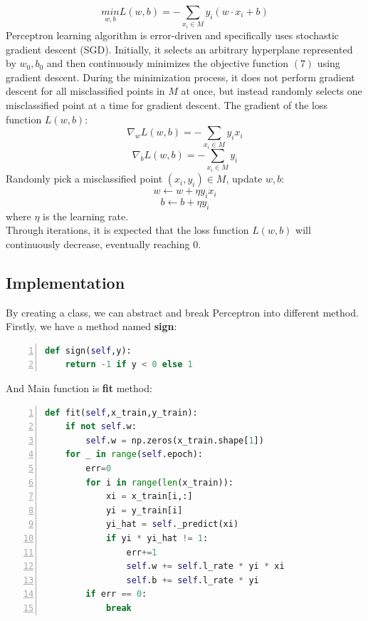 \documentclass[10pt,twocolumn,letterpaper]{article}
\begin{document}
\begin{equation}
	\underset{w,b}{min}L(w,b)=-\sum_{x_i \in M}{}y_i(w \cdot x_i + b)
\end{equation}
\indent Perceptron learning algorithm is error-driven and specifically uses stochastic gradient descent\cite{bottou2012stochastic} (SGD).
Initially, it selects an arbitrary hyperplane represented by $w_0,b_0$ and then continuously minimizes the objective function $(7)$ using gradient descent.
During the minimization process, it does not perform gradient descent for all misclassified points in $M$ at once, but instead randomly selects one misclassified point at a time for gradient descent.
The gradient of the loss function $L(w, b)$:
\begin{equation}
	\nabla_w L(w,b)=-\sum_{x_i \in M}y_i x_i
\end{equation}
\begin{equation}
	\nabla_b L(w,b)=-\sum_{x_i \in M}y_i
\end{equation}
\indent Randomly pick a misclassified point $(x_i,y_i) \in M$, update $w,b$:
\begin{equation}
	w \gets w + \eta y_i x_i
\end{equation}
\begin{equation}
	b \gets b + \eta y_i
\end{equation}
where $\eta$ is the learning rate.\\
\indent Through iterations, it is expected that the loss function $L(w, b)$ will continuously decrease, eventually reaching $0$.


\subsection{Implementation}
By creating a class, we can abstract and break Perceptron into different method.
\\
\indent Firstly, we have a method named \textbf{sign}:
\begin{lstlisting}[language={python},numbers=left,tabsize=2]
def sign(self,y):
	return -1 if y < 0 else 1
\end{lstlisting}

And Main function is \textbf{fit} method:
\begin{lstlisting}[language={python},numbers=left,tabsize=2]
def fit(self,x_train,y_train):
	if not self.w:
		self.w = np.zeros(x_train.shape[1])
	for _ in range(self.epoch):
		err=0
		for i in range(len(x_train)):
			xi = x_train[i,:]
			yi = y_train[i]
			yi_hat = self._predict(xi)
			if yi * yi_hat != 1:
				err+=1
				self.w += self.l_rate * yi * xi
				self.b += self.l_rate * yi
		if err == 0:
			break
\end{lstlisting}
\end{document}
